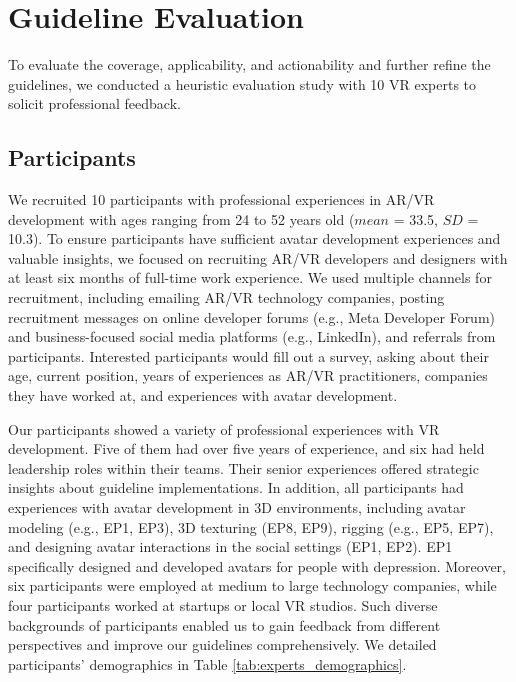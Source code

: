 \section{Guideline Evaluation}

To evaluate the coverage, applicability, and actionability and further refine the guidelines, we conducted a heuristic evaluation study with 10 VR experts to solicit professional feedback.

\subsection{Participants}
We recruited 10 participants with professional experiences in AR/VR development with ages ranging from 24 to 52 years old ($mean$ = 33.5, $SD$ = 10.3). To ensure participants have sufficient avatar development experiences and valuable insights, we focused on recruiting AR/VR developers and designers with at least six months of full-time work experience. We used multiple channels for recruitment, including emailing AR/VR technology companies, posting recruitment messages on online developer forums (e.g., Meta Developer Forum) and business-focused social media platforms (e.g., LinkedIn), and referrals from participants. Interested participants would fill out a survey, asking about their age, current position, years of experiences as AR/VR practitioners, companies they have worked at, and experiences with avatar development. 

Our participants showed a variety of professional experiences with VR development. Five of them had over five years of experience, and six had held leadership roles within their teams. Their senior experiences offered strategic insights about guideline implementations. In addition, all participants had experiences with avatar development in 3D environments, including avatar modeling (e.g., EP1, EP3), 3D texturing (EP8, EP9), rigging (e.g., EP5, EP7), and designing avatar interactions in the social settings (EP1, EP2). EP1 specifically designed and developed avatars for people with depression. Moreover, six participants were employed at medium to large technology companies, while four participants worked at startups or local VR studios. Such diverse backgrounds of participants enabled us to gain feedback from different perspectives and improve our guidelines comprehensively. We detailed participants' demographics in Table \ref{tab:experts_demographics}.



